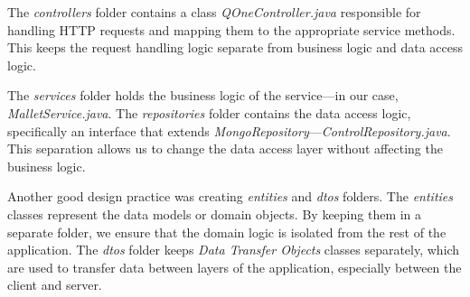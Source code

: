 The \textit{controllers} folder contains a class \textit{QOneController.java} responsible for handling HTTP requests
and mapping them to the appropriate service methods. This keeps the request handling logic separate from business
logic and data access logic.

The \textit{services} folder holds the business logic of the service—in our case, \textit{MalletService.java}. The
\textit{repositories} folder contains the data access logic, specifically an interface that extends
\textit{MongoRepository}—\textit{ControlRepository.java}. This separation allows us to change the data access layer
without affecting the business logic.

Another good design practice was creating \textit{entities} and \textit{dtos} folders. The \textit{entities} classes
represent the data models or domain objects. By keeping them in a separate folder, we ensure that the domain logic
is isolated from the rest of the application. The \textit{dtos} folder keeps \textit{Data Transfer Objects} classes
separately, which are used to transfer data between layers of the application, especially between the client and server.


